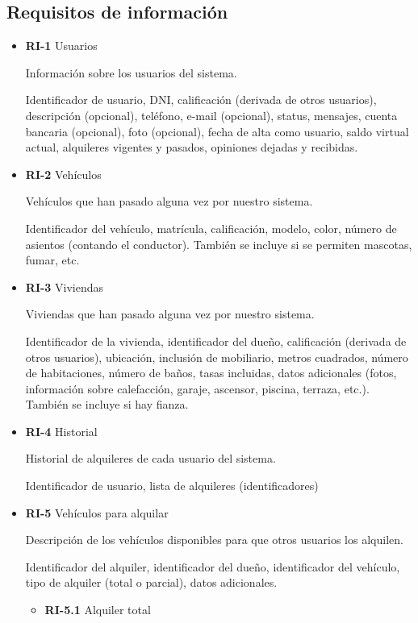 \documentclass[11pt,spanish]{article} %
\begin{document}
\subsection{Requisitos de información}
\begin{itemize}
	\item \textbf{RI-1} Usuarios
	
	Información sobre los usuarios del sistema.
	
	Identificador de usuario, DNI, calificación (derivada de otros usuarios), descripción (opcional), teléfono, e-mail (opcional), status, mensajes, cuenta bancaria (opcional), foto (opcional), fecha de alta como usuario, saldo virtual actual, alquileres vigentes y pasados, opiniones dejadas y recibidas.
	
	\item \textbf{RI-2} Vehículos
	
	Vehículos que han pasado alguna vez por nuestro sistema.
	
	Identificador del vehículo, matrícula, calificación, modelo, color, número de asientos (contando el conductor).
	También se incluye si se permiten mascotas, fumar, etc.
	
	\item \textbf{RI-3} Viviendas
	
	Viviendas que han pasado alguna vez por nuestro sistema.
	
	Identificador de la vivienda, identificador del dueño, calificación (derivada de otros usuarios), ubicación, inclusión de mobiliario, metros cuadrados, número de habitaciones, número de baños, tasas incluidas, datos adicionales (fotos, información sobre calefacción, garaje, ascensor, piscina, terraza, etc.).
	También se incluye si hay fianza.
	
	\item \textbf{RI-4} Historial
	
	Historial de alquileres de cada usuario del sistema.
	
	Identificador de usuario, lista de alquileres (identificadores)
		
	\item \textbf{RI-5} Vehículos para alquilar
	
	Descripción de los vehículos disponibles para que otros usuarios los alquilen.
	
	Identificador del alquiler, identificador del dueño, identificador del vehículo, tipo de alquiler (total o parcial), datos adicionales.
	\begin{itemize}
		\item \textbf{RI-5.1} Alquiler total
		

\end{itemize}
\end{itemize}
\end{document}
